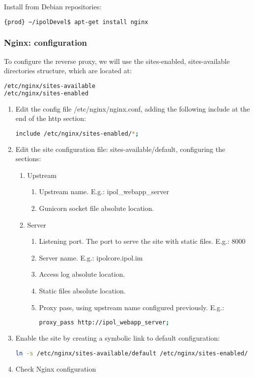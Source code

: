 Install from Debian repositories:
\begin{lstlisting}[language=Bash]
{prod} ~/ipolDevel$ apt-get install nginx
\end{lstlisting}

\subsubsection{Nginx: configuration}
To configure the reverse proxy, we will use the sites-enabled, sites-available directories structure, which are located at:
\begin{lstlisting}[language=Bash]
/etc/nginx/sites-available
/etc/nginx/sites-enabled
\end{lstlisting}

\begin{enumerate}
\item Edit the config file /etc/nginx/nginx.conf, adding the following include at the end of the http section:
\begin{lstlisting}[language=Bash]
include /etc/nginx/sites-enabled/*;
\end{lstlisting}
\item Edit the site configuration file: sites-available/default, configuring the sections:
\begin{enumerate}
\item Upstream
\begin{enumerate}
\item Upstream name. E.g.: ipol\_webapp\_server
\item Gunicorn socket file absolute location.
\end{enumerate}
\item Server
\begin{enumerate}
\item Listening port. The port to serve the site with static files. E.g.: 8000
\item Server name. E.g.: ipolcore.ipol.im
\item Access log absolute location.
\item Static files absolute location.
\item Proxy pass, using upstream name configured previously.
E.g.:
\begin{lstlisting}[language=Bash]
proxy_pass http://ipol_webapp_server;
\end{lstlisting}

\end{enumerate}
\end{enumerate}
\item Enable the site by creating a symbolic link to default configuration:
\begin{lstlisting}[language=Bash]
ln -s /etc/nginx/sites-available/default /etc/nginx/sites-enabled/
\end{lstlisting}
\item Check Nginx configuration
\begin{lstlisting}[language=Bash]

\end{lstlisting}
\end{enumerate}

